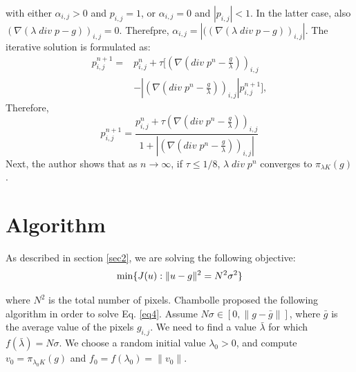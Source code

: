 \documentclass[11pt]{article}
\begin{document}
with either $\alpha_{i,j} > 0$ and $p_{i,j} = 1$, or $\alpha_{i,j} = 0$ and $|p_{i,j}| < 1$. In the latter case, also $(\nabla(\lambda \; div \; p - g))_{i,j} = 0$. Therefpre, $\alpha_{i,j} = |((\nabla(\lambda \; div \; p - g))_{i,j}|$. The iterative solution is formulated as:
\vspace{-5pt}
\begin{eqnarray*}
  p_{i,j}^{n+1} = & p_{i,j}^n + \tau [ (\nabla(div \; p^{n} - \frac{g}{\lambda}))_{i,j}  \\
  		& -|(\nabla(div \; p^{n} - \frac{g}{\lambda}))_{i,j}| p_{i,j}^{n+1} ],
\end{eqnarray*}
Therefore,
\begin{equation}
p_{i,j}^{n+1} = \frac{p_{i,j}^{n} + \tau (\nabla(div \; p^{n} - \frac{g}{\lambda}))_{i,j} }{ 1 +  |(\nabla(div \; p^{n} - \frac{g}{\lambda}))_{i,j}| }
\label{eq3}
\end{equation}
\vspace{-5pt}
Next, the author shows that as $n \rightarrow \infty$, if $\tau \le 1/8$, $\lambda \; div \; p^{n}$ converges to $\pi_{\lambda K}(g)$.

\vspace{-10pt}
\section{Algorithm}
\label{sec3}
\vspace{-10pt}

As described in section \ref{sec2}, we are solving the following objective:
\vspace{-5pt}
\begin{equation}
	\min\{J(u) : \| u - g \|^2 = N^2\sigma^2\}
\vspace{-5pt}
\label{eq4}
\end{equation}

where $N^2$ is the total number of pixels. Chambolle proposed the following algorithm in order to solve Eq. \ref{eq4}. Assume $N\sigma \in [0, \| g - \bar{g}\|]$, where $\bar{g}$ is the average value of the pixels $g_{i,j}$. We need to find a value $\bar{\lambda}$ for which $f(\bar{\lambda}) = N\sigma$. We choose a random initial value $\lambda_{0} > 0$, and compute $v_0 = \pi_{\lambda_0 K}(g)$ and $f_0 = f(\lambda_0) = \| v_0\| $.

\vspace{-10pt}
\end{document}

